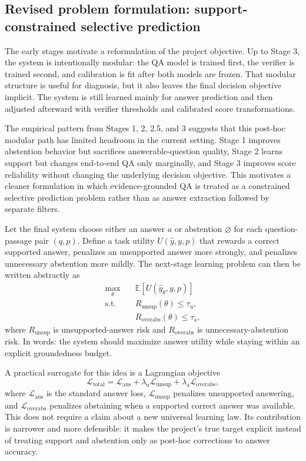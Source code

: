 \subsection{Revised problem formulation: support-constrained selective prediction}

The early stages motivate a reformulation of the project objective.
Up to Stage 3, the system is intentionally modular:
the QA model is trained first, the verifier is trained second, and calibration
is fit after both models are frozen.
That modular structure is useful for diagnosis, but it also leaves the final
decision objective implicit.
The system is still learned mainly for answer prediction and then adjusted
afterward with verifier thresholds and calibrated score transformations.

The empirical pattern from Stages 1, 2, 2.5, and 3 suggests that this post-hoc modular path
has limited headroom in the current setting.
Stage 1 improves abstention behavior but sacrifices answerable-question
quality, Stage 2 learns support but changes end-to-end QA only marginally, and
Stage 3 improves score reliability without changing the underlying decision
objective.
This motivates a cleaner formulation in which evidence-grounded QA is treated
as a constrained selective prediction problem rather than as answer extraction
followed by separate filters.

Let the final system choose either an answer \(a\) or abstention
\(\varnothing\) for each question-passage pair \((q, p)\).
Define a task utility
\(U(\hat{y}, y, p)\)
that rewards a correct supported answer, penalizes an unsupported answer more
strongly, and penalizes unnecessary abstention more mildly.
The next-stage learning problem can then be written abstractly as
\begin{align}
  \max_{\theta} \quad & \mathbb{E}\left[ U(\hat{y}_{\theta}, y, p) \right] \\
  \text{s.t.} \quad &
  R_{\mathrm{unsup}}(\theta) \le \tau_{\mathrm{u}}, \\
  &
  R_{\mathrm{overabs}}(\theta) \le \tau_{\mathrm{a}},
\end{align}
where \(R_{\mathrm{unsup}}\) is unsupported-answer risk and
\(R_{\mathrm{overabs}}\) is unnecessary-abstention risk.
In words:
the system should maximize answer utility while staying within an explicit
groundedness budget.

A practical surrogate for this idea is a Lagrangian objective
\begin{equation}
  \mathcal{L}_{\mathrm{total}}
  =
  \mathcal{L}_{\mathrm{ans}}
  +
  \lambda_{\mathrm{u}} \mathcal{L}_{\mathrm{unsup}}
  +
  \lambda_{\mathrm{a}} \mathcal{L}_{\mathrm{overabs}},
\end{equation}
where \(\mathcal{L}_{\mathrm{ans}}\) is the standard answer loss,
\(\mathcal{L}_{\mathrm{unsup}}\) penalizes unsupported answering, and
\(\mathcal{L}_{\mathrm{overabs}}\) penalizes abstaining when a supported
correct answer was available.
This does not require a claim about a new universal learning law.
Its contribution is narrower and more defensible:
it makes the project's true target explicit instead of treating support and
abstention only as post-hoc corrections to answer accuracy.

